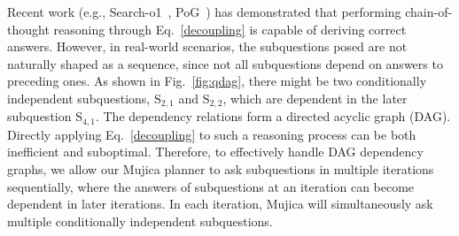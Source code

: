 Recent work (e.g., Search-o1~\cite{Search-o1}, PoG~\cite{PoG}) has demonstrated that performing chain-of-thought reasoning through Eq.~\ref{decoupling} is capable of deriving correct answers.
However, in real-world scenarios, the subquestions posed are not naturally shaped as a sequence, since not all subquestions depend on answers to preceding ones.
As shown in Fig.~\ref{fig:qdag}, there might be two conditionally independent subquestions, $\text{S}_{2,1}$ and $\text{S}_{2,2}$, which are dependent in the later subquestion $\text{S}_{4,1}$.
The dependency relations form a directed acyclic graph (DAG).
Directly applying Eq.~\ref{decoupling} to such a reasoning process can be both inefficient and suboptimal.
Therefore, to effectively handle DAG dependency graphs,
we allow our Mujica planner to ask subquestions in multiple iterations sequentially, where the answers of subquestions at an iteration can become dependent in later iterations.
In each iteration, Mujica will simultaneously ask multiple conditionally independent subquestions.









